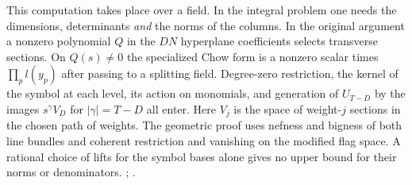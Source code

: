 This computation takes place over a field. In the integral problem one
needs the dimensions, determinants \emph{and} the norms of the columns.
In the original argument a nonzero polynomial \(Q\) in the \(DN\)
hyperplane coefficients selects transverse sections. On \(Q(s)\ne0\)
the specialized Chow form is a nonzero scalar times
\(\prod_p l(y_p)\) after passing to a splitting field. Degree-zero
restriction, the kernel of the symbol at each level, its action on
monomials, and generation of \(U_{T-D}\) by the images \(s^\gamma V_D\)
for \(|\gamma|=T-D\) all enter. Here \(V_j\) is the space of
weight-\(j\) sections in the chosen path of weights. The geometric
proof uses nefness and bigness of both line bundles and coherent
restriction and vanishing on the modified flag space. A rational
choice of lifts for the symbol bases alone gives no upper bound for
their norms or denominators.
;
.

